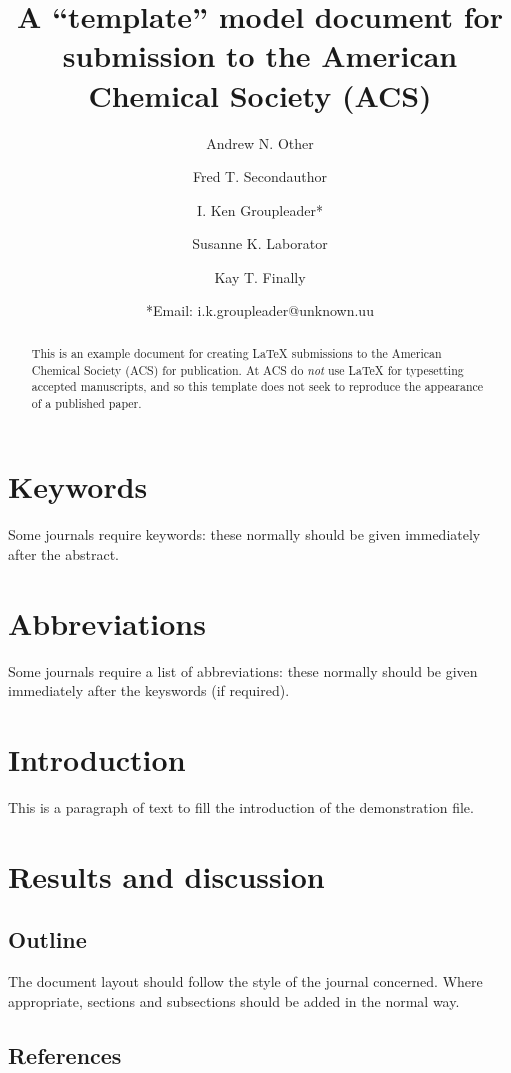 \documentclass[letterpaper]{article}
\author[1]{Andrew N. Other}
\author[1]{Fred T. Secondauthor}
\author[1]{I. Ken Groupleader*}
\affil[1]{Department of Chemistry, Unknown University, Unknown Town}
\author[2]{Susanne K. Laborator}
\affil[2]{Lead Discovery, BigPharma, Big Town, USA}
\author[1]{Kay T. Finally}
\title{A ``template'' model document for submission to the
  American Chemical Society (ACS)}
\date{*Email: i.k.groupleader@unknown.uu}
\begin{document}
\maketitle

\begin{abstract}
  This is an example document for creating \LaTeX{} submissions to the American
  Chemical Society (ACS) for publication. At ACS do \emph{not} use \LaTeX{} for
  typesetting accepted manuscripts, and so this template does not seek to
  reproduce the appearance of a published paper.
\end{abstract}

\section*{Keywords}

Some journals require keywords: these normally should be given immediately
after the abstract.

\section*{Abbreviations}

Some journals require a list of abbreviations: these normally should be given
immediately after the keyswords (if required).

\section{Introduction}

This is a paragraph of text to fill the introduction of the demonstration file. 

\section{Results and discussion}

\subsection{Outline}

The document layout should follow the style of the journal concerned. Where
appropriate, sections and subsections should be added in the normal way.

\subsection{References}
\end{document}
